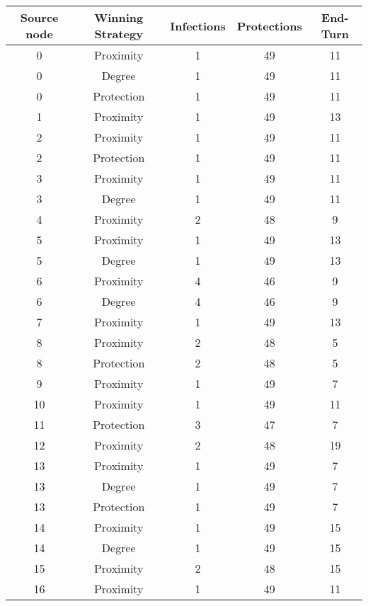 \documentclass[results.tex]{subfiles}
\begin{document}
\begin{center}
  \begin{tabular}{| c || c | c | c | c |}
    \hline
    {\bfseries Source node} & {\bfseries Winning Strategy} & {\bfseries Infections} & {\bfseries Protections} & {\bfseries End-Turn} \\  %
    \hline\hline
    0 & Proximity & 1 & 49 & 11 \\ 
    \hline
    0 & Degree & 1 & 49 & 11 \\ 
    \hline
    0 & Protection & 1 & 49 & 11 \\ 
    \hline
    1 & Proximity & 1 & 49 & 13 \\ 
    \hline
    2 & Proximity & 1 & 49 & 11 \\ 
    \hline
    2 & Protection & 1 & 49 & 11 \\ 
    \hline
    3 & Proximity & 1 & 49 & 11 \\ 
    \hline
    3 & Degree & 1 & 49 & 11 \\ 
    \hline
    4 & Proximity & 2 & 48 & 9 \\ 
    \hline
    5 & Proximity & 1 & 49 & 13 \\ 
    \hline
    5 & Degree & 1 & 49 & 13 \\ 
    \hline
    6 & Proximity & 4 & 46 & 9 \\ 
    \hline
    6 & Degree & 4 & 46 & 9 \\ 
    \hline
    7 & Proximity & 1 & 49 & 13 \\ 
    \hline
    8 & Proximity & 2 & 48 & 5 \\ 
    \hline
    8 & Protection & 2 & 48 & 5 \\ 
    \hline
    9 & Proximity & 1 & 49 & 7 \\ 
    \hline
    10 & Proximity & 1 & 49 & 11 \\ 
    \hline
    11 & Protection & 3 & 47 & 7 \\ 
    \hline
    12 & Proximity & 2 & 48 & 19 \\ 
    \hline
    13 & Proximity & 1 & 49 & 7 \\ 
    \hline
    13 & Degree & 1 & 49 & 7 \\ 
    \hline
    13 & Protection & 1 & 49 & 7 \\ 
    \hline
    14 & Proximity & 1 & 49 & 15 \\ 
    \hline
    14 & Degree & 1 & 49 & 15 \\ 
    \hline
    15 & Proximity & 2 & 48 & 15 \\ 
    \hline
    16 & Proximity & 1 & 49 & 11 \\ 

\end{tabular}
\end{center}
\end{document}
